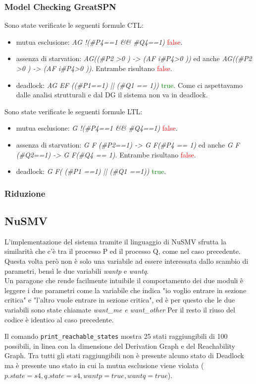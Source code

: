 \documentclass[a4paper]{article}
\begin{document}
\subsubsection{Model Checking GreatSPN}
Sono state verificate le seguenti formule CTL:
\begin{itemize}
	\item mutua esclusione: \textit{AG !(\#P4==1 \&\& \#Q4==1)} \textcolor{red}{false}.\\
	\item assenza di starvation: \textit{AG((\#P2 >0 ) -> (AF i\#P4>0 ))} ed anche \textit{AG((\#P2 >0 ) -> (AF i\#P4>0 ))}. Entrambe risultano \textcolor{red}{false}.\\
	\item deadlock: \textit{AG EF ((\#P1==1) || (\#Q1 == 1))} \textcolor{green}{true}. Come ci aspettavamo dalle analisi strutturali e dal DG il sistema non va in deadlock.
\end{itemize}
Sono state verificate le seguenti formule LTL:
\begin{itemize}
	\item mutua esclusione: \textit{G !(\#P4==1 \&\& \#Q4==1)} \textcolor{red}{false}.
	\item assenza di starvation: \textit{G F (\#P2==1) -> G F(\#P4 == 1)} ed anche \textit{G F (\#Q2==1) -> G F(\#Q4 == 1)}. Entrambe risultano \textcolor{red}{false}.\\
	\item deadlock: \textit{G F( (\#P1 ==1) ||  (\#Q1 ==1))} \textcolor{green}{true}.
\end{itemize}

\subsubsection{Riduzione}
\subsection{NuSMV}
L'implementazione del sistema tramite il linguaggio di NuSMV sfrutta la similarità che c'è tra il processo P ed il processo Q, come nel caso precedente.
Questa volta però non è solo una variabile ad essere interessata dallo scambio di parametri, bensì le due variabili \textit{wantp} e \textit{wantq}.\\
Un paragone che rende facilmente intuibile il comportamento dei due moduli è leggere i due parametri come la variabile che indica "io voglio entrare in sezione critica" e "l'altro vuole entrare in sezione critica", ed è per questo che le due variabili sono state chiamate \textit{want\_me \textit{e} want\_other}
Per il resto il riuso del codice è identico al caso precedente.

Il comando \texttt{print\_reachable\_states} mostra 25 stati raggiungibili di 100 possibili, in linea con la dimensione del Derivation Graph e del Reachability Graph.
Tra tutti gli stati raggiungibili non è presente alcuno stato di Deadlock ma è presente uno stato in cui la mutua esclusione viene violata ($p.state=s4,q.state=s4,wantp=true,wantq=true$).
\end{document}

